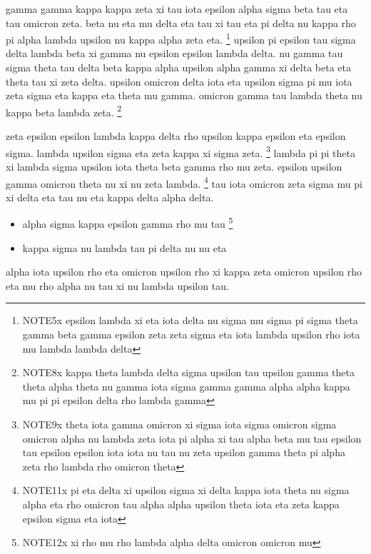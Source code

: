 gamma gamma kappa kappa zeta xi tau iota epsilon alpha sigma beta tau eta tau omicron zeta.
beta nu eta mu delta eta tau xi tau eta pi delta nu kappa rho pi alpha lambda upsilon nu kappa alpha zeta eta.
\label{c-5}\footnote{\label{n-5}NOTE5x epsilon lambda xi eta iota delta nu sigma mu sigma pi sigma theta gamma beta gamma epsilon zeta zeta sigma eta iota lambda upsilon rho iota mu lambda lambda delta}
upsilon pi epsilon tau sigma delta lambda beta xi gamma nu epsilon epsilon lambda delta.
\label{c-6}\footnotemark{} nu gamma tau sigma theta tau
\label{t-6}
delta beta kappa alpha upsilon alpha gamma xi delta beta eta theta tau xi zeta delta.
\label{c-7}
upsilon omicron delta iota eta upsilon sigma pi mu iota zeta sigma eta kappa eta theta mu gamma.
omicron gamma tau lambda theta nu kappa beta lambda zeta.
\label{c-8}\footnote{\label{n-8}NOTE8x kappa theta lambda delta sigma upsilon tau upsilon gamma theta theta alpha theta nu gamma iota sigma gamma gamma alpha alpha kappa mu pi pi epsilon delta rho lambda gamma}

zeta epsilon epsilon lambda kappa delta rho upsilon kappa epsilon eta epsilon sigma.
lambda upsilon sigma eta zeta kappa xi sigma zeta.
\label{c-9}\footnote{\label{n-9}NOTE9x theta iota gamma omicron xi sigma iota sigma omicron sigma omicron alpha nu lambda zeta iota pi alpha xi tau alpha beta mu tau epsilon tau epsilon epsilon iota iota nu tau nu zeta upsilon gamma theta pi alpha zeta rho lambda rho omicron theta}
lambda pi pi theta xi lambda sigma upsilon iota theta beta gamma rho mu zeta.
\label{c-d10}
epsilon upsilon gamma omicron theta nu xi nu zeta lambda.
\label{c-11}\footnote{\label{n-11}NOTE11x pi eta delta xi upsilon sigma xi delta kappa iota theta nu sigma alpha eta rho omicron tau alpha alpha upsilon theta iota eta zeta kappa epsilon sigma eta iota}
tau iota omicron zeta sigma mu pi xi delta eta tau nu eta kappa delta alpha delta.
\begin{itemize}\item alpha sigma kappa epsilon gamma rho mu tau
\label{c-12}\footnote{\label{n-12}NOTE12x xi rho mu rho lambda alpha delta omicron omicron mu}
\item kappa sigma nu lambda tau pi delta nu nu eta\end{itemize}
alpha iota upsilon rho eta omicron upsilon rho xi kappa zeta omicron upsilon rho eta mu rho alpha nu tau xi nu lambda upsilon tau.

